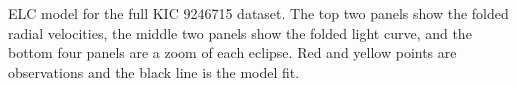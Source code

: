 \label{fig:ELCresult} ELC model for the full KIC 9246715 dataset. The top two panels show the folded radial velocities, the middle two panels show the folded light curve, and the bottom four panels are a zoom of each eclipse. Red and yellow points are observations and the black line is the model fit.
